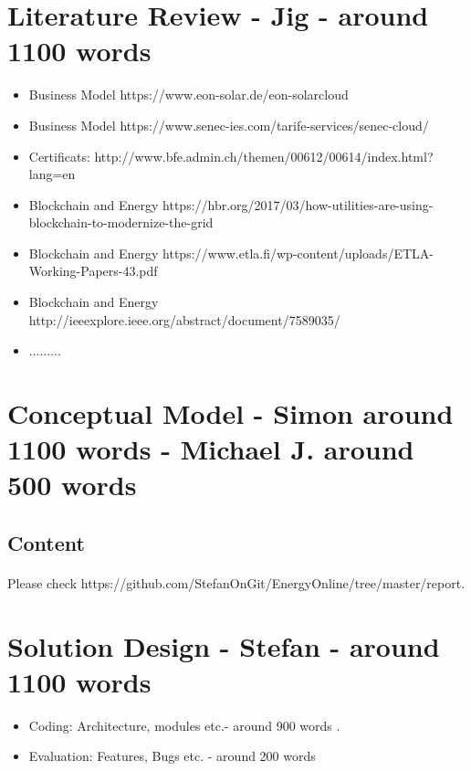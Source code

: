 \documentclass{scrartcl}
\begin{document}
	\section{Literature Review - Jig - around 1100 words}
    
    \begin{itemize}
    \item Business Model https://www.eon-solar.de/eon-solarcloud
    \item Business Model https://www.senec-ies.com/tarife-services/senec-cloud/
    \item Certificats: http://www.bfe.admin.ch/themen/00612/00614/index.html?lang=en
    \item Blockchain and Energy https://hbr.org/2017/03/how-utilities-are-using-blockchain-to-modernize-the-grid
    \item Blockchain and Energy https://www.etla.fi/wp-content/uploads/ETLA-Working-Papers-43.pdf
    \item Blockchain and Energy http://ieeexplore.ieee.org/abstract/document/7589035/
    \item .........
    \end{itemize}
	
	\section{Conceptual Model - Simon around 1100 words - Michael J. around 500 words}
	\subsection{Content}
    \paragraph{}
    Please check https://github.com/StefanOnGit/EnergyOnline/tree/master/report.

    
    \section{Solution Design - Stefan - around 1100 words}
   
    \begin{itemize}
    \item Coding: Architecture, modules etc.- around 900 words .
    \item Evaluation: Features, Bugs etc. - around 200 words
    \end{itemize}
	
\end{document}
